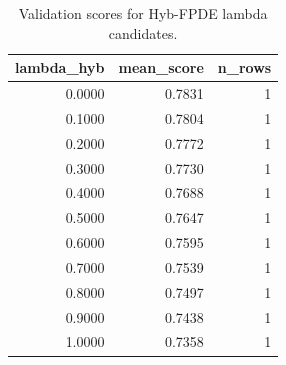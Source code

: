 \begin{table}[t]
\caption{Validation scores for Hyb-FPDE lambda candidates.}
\label{tab:lambda_distribution_computed}
\centering
\begin{tabular}{rrr}
\toprule
lambda\_hyb & mean\_score & n\_rows \\
\midrule
0.0000 & 0.7831 & 1 \\
0.1000 & 0.7804 & 1 \\
0.2000 & 0.7772 & 1 \\
0.3000 & 0.7730 & 1 \\
0.4000 & 0.7688 & 1 \\
0.5000 & 0.7647 & 1 \\
0.6000 & 0.7595 & 1 \\
0.7000 & 0.7539 & 1 \\
0.8000 & 0.7497 & 1 \\
0.9000 & 0.7438 & 1 \\
1.0000 & 0.7358 & 1 \\
\bottomrule
\end{tabular}

\end{table}
